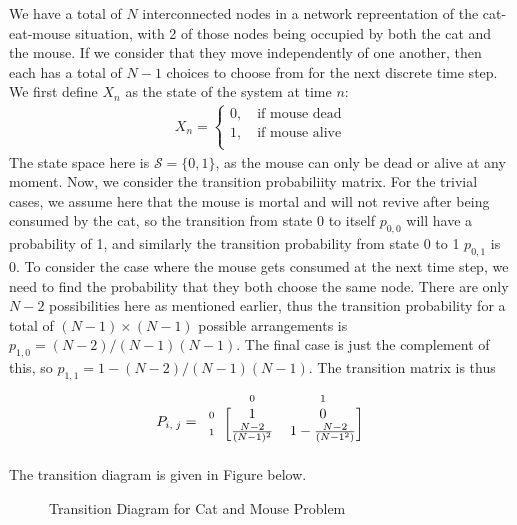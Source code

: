 \documentclass[12pt]{article}
\newcommand{\matindex}[1]{\mbox{\scriptsize#1}}%
\begin{document}
We have a total of $N$ interconnected nodes in a network repreentation of the cat-eat-mouse situation, with 2 of those nodes being occupied by both the cat and the mouse. If we consider that they move independently of one another, then each has a total of $N-1$ choices to choose from for the next discrete time step. We first define $X_n$ as the state of the system at time $n$: \begin{align*}
    X_n = \begin{cases}
        0, \quad \text{if mouse dead} \\ 
        1, \quad \text{if mouse alive} \\ 
    \end{cases}
\end{align*} The state space here is $\mathcal{S} = \{0, 1\}$, as the mouse can only be dead or alive at any moment. Now, we consider the transition probabiliity matrix. For the trivial cases, we assume here that the mouse is mortal and will not revive after being consumed by the cat, so the transition from state 0 to itself $p_{0,0}$ will have a probability of 1, and similarly the transition probability from state 0 to 1 $p_{0,1}$ is 0. To consider the case where the mouse gets consumed at the next time step, we need to find the probability that they both choose the same node. There are only $N-2$ possibilities here as mentioned earlier, thus the transition probability for a total of $(N-1)\times(N-1)$ possible arrangements is $p_{1,0} = (N-2) / (N-1)(N-1)$. The final case is just the complement of this, so $p_{1,1} = 1 - (N - 2) / (N-1)(N-1)$. The transition matrix is thus \begin{equation}
        P_{i, \; j} = \begin{blockarray}{ccc}
        & \matindex{0} & \matindex{1} \\ 
            \begin{block}{c[cc]}
                \matindex{0} & 1 & 0 \\ 
                \matindex{1} & \frac{N-2}{(N-1)^{2}} & 1 - \frac{N-2}{(N-1^{2})} \\
            \end{block}
        \end{blockarray}
\end{equation} The transition diagram is given in Figure below. 

\begin{figure}[h]
    \centering
    \caption{Transition Diagram for Cat and Mouse Problem}
    \label{fig:1-transition_diagram}
\end{figure}
\end{document}
